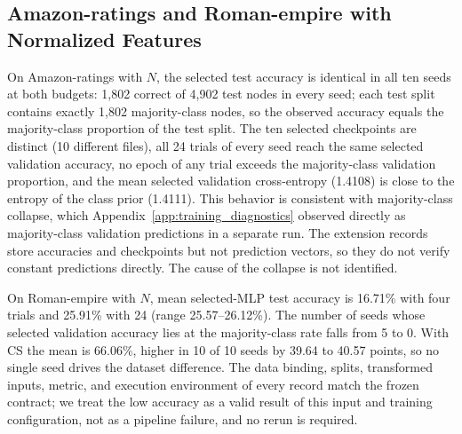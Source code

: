 \subsection{Amazon-ratings and Roman-empire with Normalized Features}

On Amazon-ratings with $N$, the selected test accuracy is identical in all ten seeds at both budgets: 1,802 correct of 4,902 test nodes in every seed; each test split contains exactly 1,802 majority-class nodes, so the observed accuracy equals the majority-class proportion of the test split. The ten selected checkpoints are distinct (10 different files), all 24 trials of every seed reach the same selected validation accuracy, no epoch of any trial exceeds the majority-class validation proportion, and the mean selected validation cross-entropy (1.4108) is close to the entropy of the class prior (1.4111). This behavior is consistent with majority-class collapse, which Appendix~\ref{app:training_diagnostics} observed directly as majority-class validation predictions in a separate run. The extension records store accuracies and checkpoints but not prediction vectors, so they do not verify constant predictions directly. The cause of the collapse is not identified.

On Roman-empire with $N$, mean selected-MLP test accuracy is 16.71\% with four trials and 25.91\% with 24 (range 25.57--26.12\%). The number of seeds whose selected validation accuracy lies at the majority-class rate falls from 5 to 0. With CS the mean is 66.06\%, higher in 10 of 10 seeds by 39.64 to 40.57 points, so no single seed drives the dataset difference. The data binding, splits, transformed inputs, metric, and execution environment of every record match the frozen contract; we treat the low accuracy as a valid result of this input and training configuration, not as a pipeline failure, and no rerun is required.
